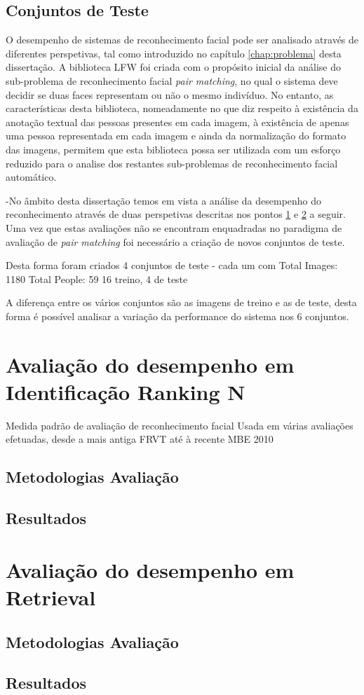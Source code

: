 \subsection{Conjuntos de Teste}  \label{sec:conjuntos}
O desempenho de sistemas de reconhecimento facial pode ser analisado através de diferentes perspetivas, tal como introduzido no capítulo \ref{chap:problema} desta dissertação. A biblioteca LFW foi criada com o propósito inicial da análise do sub-problema de reconhecimento facial \textit{pair matching}, no qual o sistema deve decidir se duas faces representam ou não o mesmo indivíduo. No entanto, as características desta biblioteca, nomeadamente no que diz respeito à existência da anotação textual das pessoas presentes em cada imagem, à existência de apenas uma pessoa representada em cada imagem e ainda da normalização do formato das imagens, permitem que esta biblioteca possa ser utilizada com um esforço reduzido para o analise dos restantes sub-problemas de reconhecimento facial automático.

-No âmbito desta dissertação temos em vista a análise da desempenho do reconhecimento através de duas perspetivas descritas nos pontos \ref{sec:avaliacao1} e \ref{sec:avaliacao2} a seguir. Uma vez que estas avaliações não se encontram enquadradas no paradigma de avaliação de \textit{pair matching} foi necessário a criação de novos conjuntos de teste. 

Desta forma foram criados 4 conjuntos de teste
- cada um com
	Total Images: 1180
	Total People: 59
	16 treino, 4 de teste
	
A diferença entre os vários conjuntos são as imagens de treino e as de teste, desta forma é possível analisar a variação da performance do sistema nos 6 conjuntos.


\section{Avaliação do desempenho em Identificação Ranking N} \label{sec:avaliacao1}
Medida padrão de avaliação de reconhecimento facial
Usada em várias avaliações efetuadas, desde a mais antiga FRVT até à recente MBE 2010

\subsection{Metodologias Avaliação}

\subsection{Resultados}

\section{Avaliação do desempenho em Retrieval} \label{sec:avaliacao2}

\subsection{Metodologias Avaliação}

\subsection{Resultados}

